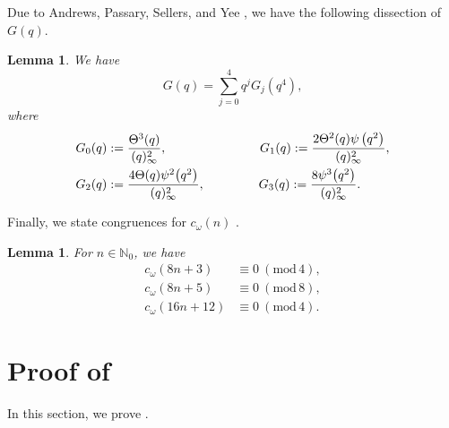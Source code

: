 \documentclass[12pt,reqno]{amsart}
\renewcommand{\o}{{\omega}}
\renewcommand{\(}{\left\(}
\renewcommand{\)}{\right\)}
\numberwithin{equation}{section}
\theoremstyle{plain}
\newtheorem{lemma}[theorem]{Lemma}
\theoremstyle{definition}
\numberwithin{equation}{section}
\renewcommand{\pmod}[1]{\ \left( \mathrm{mod} \, #1 \right)}
\begin{document}
Due to Andrews, Passary, Sellers, and Yee \cite[Lemma 3.1]{APSY}, we have the following dissection of $G(q)$.
\begin{lemma}\label{Fdissection}
We have
\[
G\left(q\right)=\sum_{j=0}^{4} q^jG_j\!\left(q^4\right),
\]
where
\begin{align*}
G_0(q)&:=\frac{\Theta^3(q)}{(q)^2_{\infty}},\hspace{2.6 cm}  G_1(q):=\frac{2\Theta^2(q)\psi\left(q^2\right)}{(q)^2_{\infty}},\\ G_2(q)&:=\frac{4\Theta(q)\psi^2\!\left(q^2\right)}{(q)^2_{\infty}},\hspace{1.5 cm} G_3(q):=\frac{8\psi^3\!\left(q^2\right)}{(q)^2_{\infty}}.
\end{align*}
\end{lemma}

Finally, we state congruences for $c_{\o}(n)$ \cite[Theorem 3.4]{APSY}. 
\begin{lemma}\label{Ref1}
	For $n\in \mathbb{N}_0$, we have 
	\begin{align*}
	c_{\o}\left(8n+3\right)&\equiv 0\!\pmod{4},\\
	c_{\o}\left(8n+5\right)&\equiv 0\!\pmod{8},\\
	c_{\o}\left(16n+12\right)&\equiv 0\!\pmod{4}.
	\end{align*}
\end{lemma}
 














\section{Proof of }\label{sec2}
 
 In this section, we prove .
\end{document}
